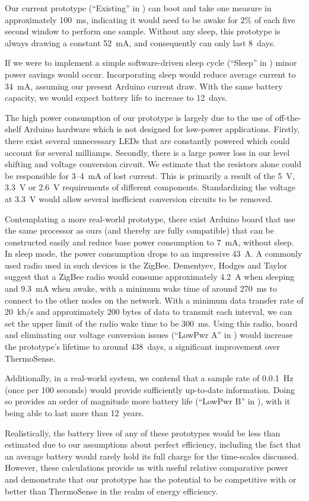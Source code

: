 \documentclass[../thesis/thesis.tex]{subfiles}
\begin{document}
Our current prototype (``Existing'' in ) can boot and take one measure in approximately 100~ms, indicating it would need to be awake for 2\% of each five second window to perform one sample. Without any sleep, this prototype is always drawing a constant 52~mA, and consequently can only last 8~days.

If we were to implement a simple software-driven sleep cycle (``Sleep'' in ) minor power savings would occur. Incorporating sleep would reduce average current to 34~mA, assuming our present Arduino current draw. With the same battery capacity, we would expect battery life to increase to 12~days.

The high power consumption of our prototype is largely due to the use of off-the-shelf Arduino hardware which is not designed for low-power applications. Firstly, there exist several unnecessary LEDs that are constantly powered which could account for several milliamps. Secondly, there is a large power loss in our level shifting and voltage conversion circuit. We estimate that the resistors alone could be responsible for 3--4~mA of lost current. This is primarily a result of the 5~V, 3.3~V or 2.6~V requirements of different components. Standardizing the voltage at 3.3~V would allow several inefficient conversion circuits to be removed.

Contemplating a more real-world prototype, there exist Arduino board that use the same processor as ours (and thereby are fully compatible) that can be constructed easily and reduce base power consumption to 7~mA, without sleep. In sleep mode, the power consumption drops to an impressive 43~\textmu A. A commonly used radio used in such devices is the ZigBee. Dementyev, Hodges and Taylor~\etal~\cite{dementyev2013power} suggest that a ZigBee radio would consume approximately 4.2~\textmu A when sleeping and 9.3~mA when awake, with a minimum wake time of around 270~ms to connect to the other nodes on the network. With a minimum data transfer rate of 20~kb/s and approximately 200 bytes of data to transmit each interval, we can set the upper limit of the radio wake time to be 300~ms. Using this radio, board and eliminating our voltage conversion issues (``LowPwr A'' in ) would increase the prototype's lifetime to around 438~days, a significant improvement over ThermoSense.

Additionally, in a real-world system, we contend that a sample rate of 0.0.1~Hz (once per 100 seconds) would provide sufficiently up-to-date information. Doing so provides an order of magnitude more battery life (``LowPwr B'' in ), with it being able to last more than 12~years.

Realistically, the battery lives of any of these prototypes would be less than estimated due to our assumptions about perfect efficiency, including the fact that an average battery would rarely hold its full charge for the time-scales discussed. However, these calculations provide us with useful relative comparative power and demonstrate that our prototype has the potential to be competitive with or better than ThermoSense in the realm of energy efficiency.

\end{document}
